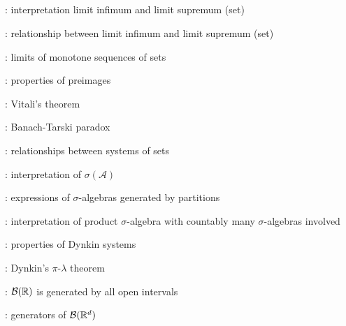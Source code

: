 \subsection*{}
\item {}: interpretation limit infimum and limit supremum (set)
\item {}: relationship between limit infimum and limit supremum (set)
\item {}: limits of monotone sequences of sets
\item {}: properties of preimages
\item {}: Vitali's theorem
\item {}: Banach-Tarski paradox
\item {}: relationships between systems of sets
\item {}: interpretation of \(\sigma(\mathcal{A})\)
\item {}: expressions of \(\sigma\)-algebras generated by partitions
\item {}: interpretation of product
\(\sigma\)-algebra with countably many \(\sigma\)-algebras involved
\item {}: properties of Dynkin systems
\item {}: Dynkin's \(\pi\)-\(\lambda\) theorem
\item {}: \(\mathcal{B}(\mathbb{R})\) is generated by all open intervals
\item {}: generators of \(\mathcal{B}(\mathbb{R}^d)\)
